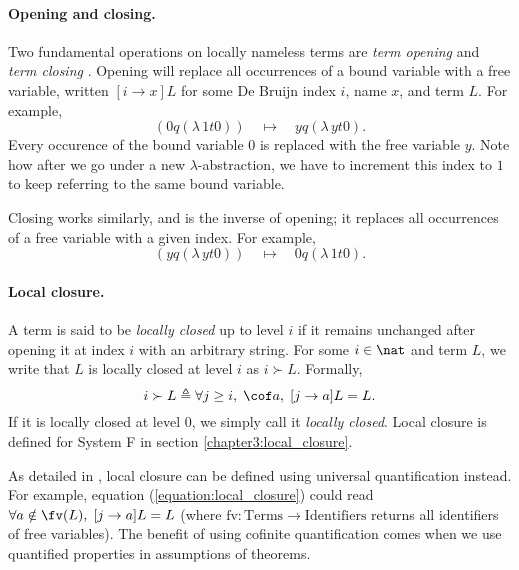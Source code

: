 \paragraph*{Opening and closing.} Two fundamental operations on locally nameless terms are
\textit{term opening} and \textit{term closing} \citep{pitts_locally_2023}. Opening will replace all
occurrences of a bound variable with a free variable, written $[i \to x] L$ for some De Bruijn
index $i$, name $x$, and term $L$. For example,
\begin{equation*}
  [0 \to y] (0 q (\lambda \, 1 t 0)) \quad \mapsto \quad y q (\lambda \, y t 0).
\end{equation*}
Every occurence of the bound variable $0$ is replaced with the free variable $y$. Note how after we
go under a new $\lambda$-abstraction, we have to increment this index to $1$ to keep referring to
the same bound variable.

Closing works similarly, and is the inverse of opening; it replaces all occurrences of a free
variable with a given index. For example,
\begin{equation*}
  [0 \leftarrow y] (y q (\lambda \, y t 0)) \quad \mapsto \quad 0 q (\lambda \, 1 t 0).
\end{equation*}

\paragraph*{Local closure.} A term is said to be \textit{locally closed} up to level $i$ if it
remains unchanged after opening it at index $i$ with an arbitrary string. For some $i \in \nat$ and
term $L$, we write that $L$ is locally closed at level $i$ as $i \succ L$. Formally,
\begin{equation}
  \label{equation:local_closure}
  i \succ L \triangleq \forall j \geq i, \; \cof a , \; [j \to a] L = L.
\end{equation}
If it is locally closed at level $0$, we simply call it \textit{locally closed}. Local closure is
defined for System F in section \ref{chapter3:local_closure}.

As detailed in \citet{aydemir_engineering_2008}, local closure can be defined using universal
quantification instead. For example, equation (\ref{equation:local_closure}) could read $\forall a
\notin \fv(L), \; [j \to a] L = L$ (where $\text{fv} \colon \text{Terms} \to \text{Identifiers}$
returns all identifiers of free variables). The benefit of using cofinite quantification comes when
we use quantified properties in assumptions of theorems.

